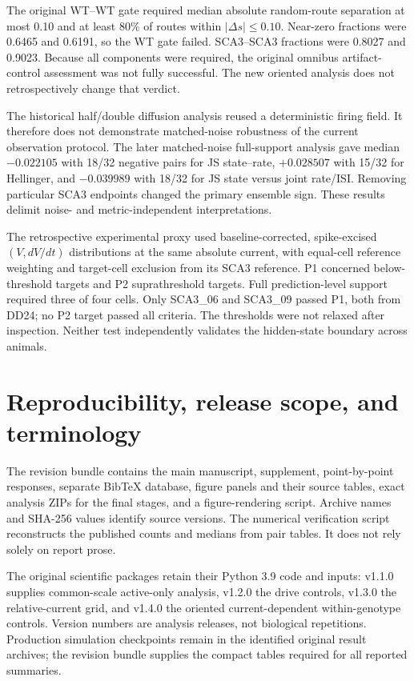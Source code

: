 \documentclass[11pt,a4paper]{article}
\begin{document}
The original WT--WT gate required median absolute random-route separation at most 0.10 and at least 80\% of routes within $|\Delta s|\leq0.10$. Near-zero fractions were 0.6465 and 0.6191, so the WT gate failed. SCA3--SCA3 fractions were 0.8027 and 0.9023. Because all components were required, the original omnibus artifact-control assessment was not fully successful. The new oriented analysis does not retrospectively change that verdict.

The historical half/double diffusion analysis reused a deterministic firing field. It therefore does not demonstrate matched-noise robustness of the current observation protocol. The later matched-noise full-support analysis gave median $-0.022105$ with 18/32 negative pairs for JS state--rate, $+0.028507$ with 15/32 for Hellinger, and $-0.039989$ with 18/32 for JS state versus joint rate/ISI. Removing particular SCA3 endpoints changed the primary ensemble sign. These results delimit noise- and metric-independent interpretations.

The retrospective experimental proxy used baseline-corrected, spike-excised $(V,dV/dt)$ distributions at the same absolute current, with equal-cell reference weighting and target-cell exclusion from its SCA3 reference. P1 concerned below-threshold targets and P2 suprathreshold targets. Full prediction-level support required three of four cells. Only SCA3\_06 and SCA3\_09 passed P1, both from DD24; no P2 target passed all criteria. The thresholds were not relaxed after inspection. Neither test independently validates the hidden-state boundary across animals.

\section{Reproducibility, release scope, and terminology}\label{s:release}
The revision bundle contains the main manuscript, supplement, point-by-point responses, separate BibTeX database, figure panels and their source tables, exact analysis ZIPs for the final stages, and a figure-rendering script. Archive names and SHA-256 values identify source versions. The numerical verification script reconstructs the published counts and medians from pair tables. It does not rely solely on report prose.

The original scientific packages retain their Python 3.9 code and inputs: v1.1.0 supplies common-scale active-only analysis, v1.2.0 the drive controls, v1.3.0 the relative-current grid, and v1.4.0 the oriented current-dependent within-genotype controls. Version numbers are analysis releases, not biological repetitions. Production simulation checkpoints remain in the identified original result archives; the revision bundle supplies the compact tables required for all reported summaries.
\end{document}
